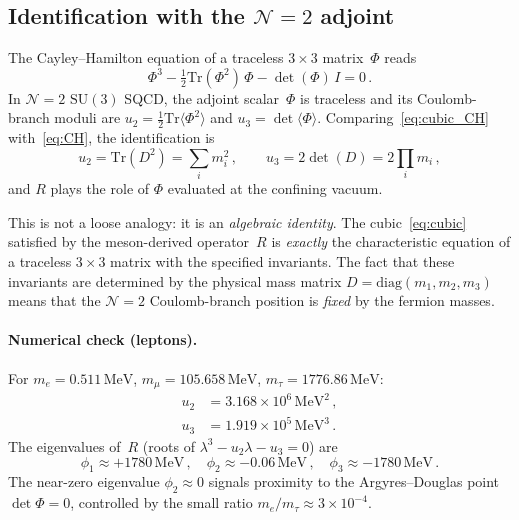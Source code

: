 \documentclass[aps,prd,twocolumn,showpacs,preprintnumbers,superscriptaddress,floatfix]{revtex4-2}
\newcommand{\SU}{\mathrm{SU}}
\newcommand{\Tr}{\mathrm{Tr}}
\newcommand{\diag}{\mathrm{diag}}
\newcommand{\MeV}{\,\mathrm{MeV}}
\begin{document}
\subsection{Identification with the $\mathcal{N}{=}2$ adjoint}

The Cayley--Hamilton equation of a traceless $3 \times 3$
matrix~$\Phi$ reads
\begin{equation}
  \Phi^3 - \tfrac{1}{2}\Tr(\Phi^2)\,\Phi - \det(\Phi)\,I = 0\,.
  \label{eq:CH}
\end{equation}
In $\mathcal{N}{=}2$ $\SU(3)$ SQCD, the adjoint scalar~$\Phi$ is
traceless and its Coulomb-branch moduli are
$u_2 = \frac{1}{2}\Tr\langle\Phi^2\rangle$ and
$u_3 = \det\langle\Phi\rangle$.
Comparing~\eqref{eq:cubic_CH} with~\eqref{eq:CH}, the
identification is
\begin{equation}
  \boxed{u_2 = \Tr(D^2) = \sum_i m_i^2\,,
  \qquad
  u_3 = 2\det(D) = 2\prod_i m_i\,,}
  \label{eq:moduli_id}
\end{equation}
and $R$ plays the role of $\Phi$ evaluated at the confining vacuum.

This is not a loose analogy: it is an \emph{algebraic identity}.
The cubic~\eqref{eq:cubic} satisfied by the meson-derived
operator~$R$ is \emph{exactly} the characteristic equation of a
traceless $3 \times 3$ matrix with the specified invariants.
The fact that these invariants are determined by the physical
mass matrix $D = \diag(m_1, m_2, m_3)$ means that the
$\mathcal{N}{=}2$ Coulomb-branch position is \emph{fixed} by the
fermion masses.

\paragraph{Numerical check (leptons).}
For $m_e = 0.511\MeV$, $m_\mu = 105.658\MeV$,
$m_\tau = 1776.86\MeV$:
\begin{align}
  u_2 &= 3.168 \times 10^6\MeV^2\,, \\
  u_3 &= 1.919 \times 10^5\MeV^3\,.
\end{align}
The eigenvalues of~$R$ (roots of $\lambda^3 - u_2\lambda - u_3 = 0$)
are
\begin{equation}
  \phi_1 \approx +1780\MeV\,,\quad
  \phi_2 \approx -0.06\MeV\,,\quad
  \phi_3 \approx -1780\MeV\,.
\end{equation}
The near-zero eigenvalue $\phi_2 \approx 0$ signals proximity to the
Argyres--Douglas point $\det\Phi = 0$, controlled by the small ratio
$m_e/m_\tau \approx 3 \times 10^{-4}$.
\end{document}
